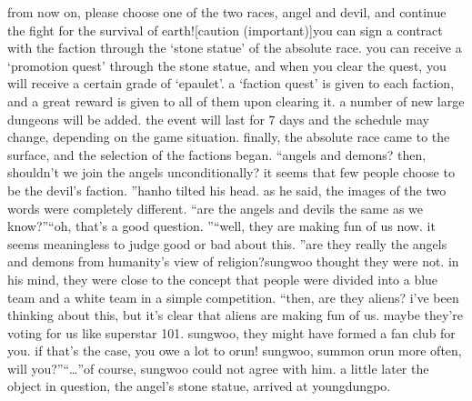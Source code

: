 from now on, please choose one of the two races, angel and devil, and continue the fight for the survival of earth![caution (important)]you can sign a contract with the faction through the ‘stone statue’ of the absolute race.
you can receive a ‘promotion quest’ through the stone statue, and when you clear the quest, you will receive a certain grade of ‘epaulet’.
a ‘faction quest’ is given to each faction, and a great reward is given to all of them upon clearing it.
a number of new large dungeons will be added.
the event will last for 7 days and the schedule may change, depending on the game situation.
finally, the absolute race came to the surface, and the selection of the factions began.
“angels and demons? then, shouldn’t we join the angels unconditionally? it seems that few people choose to be the devil’s faction.
”hanho tilted his head.
 as he said, the images of the two words were completely different.
“are the angels and devils the same as we know?”“oh, that’s a good question.
”“well, they are making fun of us now.
 it seems meaningless to judge good or bad about this.
”are they really the angels and demons from humanity’s view of religion?sungwoo thought they were not.
 in his mind, they were close to the concept that people were divided into a blue team and a white team in a simple competition.
“then, are they aliens? i’ve been thinking about this, but it’s clear that aliens are making fun of us.
 maybe they’re voting for us like superstar 101.
 sungwoo, they might have formed a fan club for you.
 if that’s the case, you owe a lot to orun! sungwoo, summon orun more often, will you?”“…”of course, sungwoo could not agree with him.
a little later the object in question, the angel’s stone statue, arrived at youngdungpo.


 